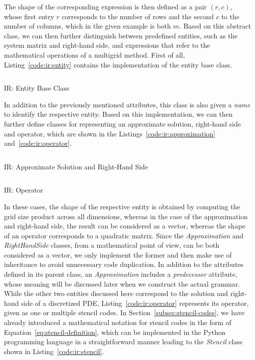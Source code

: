 The shape of the corresponding expression is then defined as a pair $(r, c)$, whose first entry $r$ corresponds to the number of rows and the second $c$ to the number of columns, which in the given example is both $m$.
Based on this abstract class, we can then further distinguish between predefined entities, such as the system matrix and right-hand side, and expressions that refer to the mathematical operations of a multigrid method.
First of all, Listing~\ref{code:ir:entity} contains the implementation of the entity base class.
\begin{listing}
	\inputminted{python}{evostencils/ir/entity.py}
	\caption{IR: Entity Base Class}
	\label{code:ir:entity}
\end{listing}
In addition to the previously mentioned attributes, this class is also given a \emph{name} to identify the respective entity.
Based on this implementation, we can then further define classes for representing an approximate solution, right-hand side and operator, which are shown in the Listings~\ref{code:ir:approximation} and~\ref{code:ir:operator}.
\begin{listing}
	\inputminted{python}{evostencils/ir/approximation.py}
	\caption{IR: Approximate Solution and Right-Hand Side}
	\label{code:ir:approximation}
\end{listing}
\begin{listing}
	\inputminted{python}{evostencils/ir/operator.py}
	\caption{IR: Operator}
	\label{code:ir:operator}
\end{listing}
In these cases, the shape of the respective entity is obtained by computing the grid size product across all dimensions, whereas in the case of the approximation and right-hand side, the result can be considered as a vector, whereas the shape of an operator corresponds to a quadratic matrix.
Since the \emph{Approximation} and \emph{RightHandSide} classes, from a mathematical point of view, can be both considered as a vector, we only implement the former and then make use of inheritance to avoid unnecessary code duplication.
In addition to the attributes defined in its parent class, an \emph{Approximation} includes a \emph{predecessor} attribute, whose meaning will be discussed later when we construct the actual grammar.
While the other two entities discussed here correspond to the solution and right-hand side of a discretized PDE, Listing~\ref{code:ir:operator} represents its operator, given as one or multiple stencil codes.
In Section~\ref{subsec:stencil-codes}, we have already introduced a mathematical notation for stencil codes in the form of Equation~\eqref{eq:stencil-definition}, which can be implemented in the Python programming language in a straightforward manner leading to the \emph{Stencil} class shown in Listing~\ref{code:ir:stencil}.

